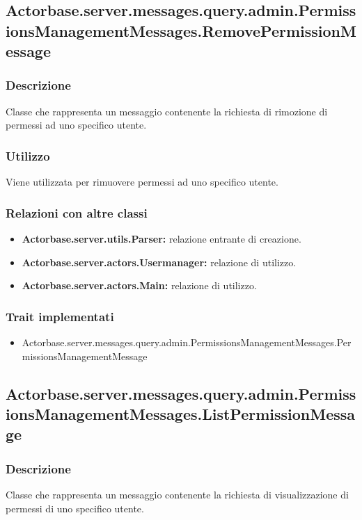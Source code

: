 \documentclass[a4paper]{article}
\begin{document}
		\subsection{Actorbase.server.messages.query.admin.PermissionsManagementMessages.RemovePermissionMessage}
			\subsubsection{Descrizione}
				Classe che rappresenta un messaggio contenente la richiesta di rimozione di permessi ad uno specifico utente.
				
			\subsubsection{Utilizzo}
				Viene utilizzata per rimuovere permessi ad uno specifico utente.
				
			\subsubsection{Relazioni con altre classi}
				\begin{itemize}
					\item \textbf{Actorbase.server.utils.Parser:} relazione entrante di creazione.
					\item \textbf{Actorbase.server.actors.Usermanager:} relazione di utilizzo.
					\item \textbf{Actorbase.server.actors.Main:} relazione di utilizzo.
				\end{itemize}
			\subsubsection{Trait implementati}
				\begin{itemize}
					\item Actorbase.server.messages.query.admin.PermissionsManagementMessages.PermissionsManagementMessage
				\end{itemize}
				
		\subsection{Actorbase.server.messages.query.admin.PermissionsManagementMessages.ListPermissionMessage}
			\subsubsection{Descrizione}
				Classe che rappresenta un messaggio contenente la richiesta di visualizzazione di permessi di uno specifico utente.
				
\end{document}
